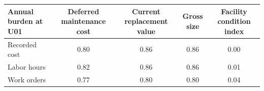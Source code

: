 \begin{tabular}{p{3.4cm}cccc}
\toprule
Annual burden at U01 & Deferred maintenance cost & Current replacement value & Gross size & Facility condition index \\
\midrule
Recorded cost & 0.80 & 0.86 & 0.86 & 0.00 \\
Labor hours & 0.82 & 0.86 & 0.86 & 0.01 \\
Work orders & 0.77 & 0.80 & 0.80 & 0.04 \\
\bottomrule
\end{tabular}
